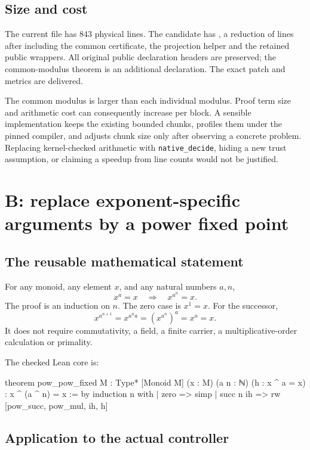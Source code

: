\documentclass[11pt,letterpaper]{article}
\newcommand{\code}[1]{\nolinkurl{#1}}
\begin{document}
\subsection{Size and cost}

The current file has 843 physical lines. The candidate has \CommonNewLines{}, a reduction of \CommonSaved{} lines after including the common certificate, the projection helper and the retained public wrappers. All original public declaration headers are preserved; the common-modulus theorem is an additional declaration. The exact patch and metrics are delivered.

The common modulus is larger than each individual modulus. Proof term size and arithmetic cost can consequently increase per block. A sensible implementation keeps the existing bounded chunks, profiles them under the pinned compiler, and adjusts chunk size only after observing a concrete problem. Replacing kernel-checked arithmetic with \code{native_decide}, hiding a new trust assumption, or claiming a speedup from line counts would not be justified.

\section{B: replace exponent-specific arguments by a power fixed point}

\subsection{The reusable mathematical statement}

For any monoid, any element \(x\), and any natural numbers \(a,n\),
\[
 x^a=x\quad\Longrightarrow\quad x^{a^n}=x.
\]
The proof is an induction on \(n\). The zero case is \(x^1=x\). For the successor,
\[
 x^{a^{n+1}}=x^{a^n a}=(x^{a^n})^a=x^a=x.
\]
It does not require commutativity, a field, a finite carrier, a multiplicative-order calculation or primality.

The checked Lean core is:
\begin{Lean}
theorem pow_pow_fixed {M : Type*} [Monoid M]
    (x : M) (a n : ℕ) (h : x ^ a = x) :
    x ^ (a ^ n) = x := by
  induction n with
  | zero => simp
  | succ n ih => rw [pow_succ, pow_mul, ih, h]
\end{Lean}

\subsection{Application to the actual controller}
\end{document}

